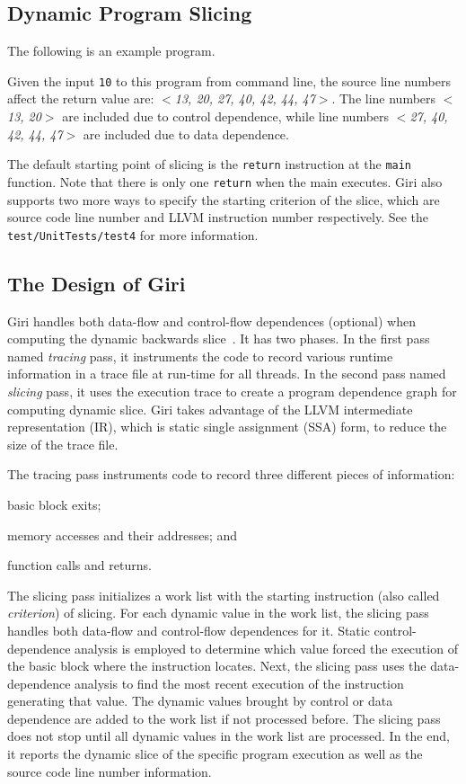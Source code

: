 \documentclass[DIV=calc, paper=a4, fontsize=11pt, twocolumn]{scrartcl}
\begin{document}
\subsection{Dynamic Program Slicing}
The following is an example program.

Given the input \texttt{10} to this program from command line,
the source line numbers affect the return value are: $<$\emph{13, 20, 27, 40, 42, 44, 47}$>$.
The line numbers $<$\emph{13, 20}$>$ are included due to control dependence,
while line numbers $<$\emph{27, 40, 42, 44, 47}$>$ are included due to data dependence.

The default starting point of slicing is the \texttt{return} instruction at the \texttt{main} function.
Note that there is only one \texttt{return} when the main executes.
Giri also supports two more ways to specify the starting criterion of the slice,
which are source code line number and LLVM instruction number respectively.
See the \texttt{test/UnitTests/test4} for more information.

\subsection{The Design of Giri}
Giri handles both data-flow and control-flow dependences (optional) when computing the dynamic backwards slice~\cite{sahoo2013asplos}.
It has two phases.
In the first pass named \emph{tracing} pass, it instruments the code to record various runtime information in a trace file at run-time for all threads.
In the second pass named \emph{slicing} pass, it uses the execution trace to create a program dependence graph for computing dynamic slice.
Giri takes advantage of the LLVM intermediate representation (IR), which is static single assignment (SSA) form, to reduce the size of the trace file. 

The tracing pass instruments code to record three different pieces of information:
\begin{inparaenum}[\itshape 1\upshape)]
	\item basic block exits;
	\item memory accesses and their addresses; and
	\item function calls and returns.
\end{inparaenum}
The slicing pass initializes a work list with the starting instruction (also called \emph{criterion}) of slicing.
For each dynamic value in the work list,
the slicing pass handles both data-flow and control-flow dependences for it.
Static control-dependence analysis is employed to determine which value forced the execution of the basic block where the instruction locates.
Next, the slicing pass uses the data-dependence analysis to find the most recent execution of the instruction generating that value.
The dynamic values brought by control or data dependence are added to the work list if not processed before.
The slicing pass does not stop until all dynamic values in the work list are processed.
In the end, it reports the dynamic slice of the specific program execution as well as the source code line number information.
\end{document}

